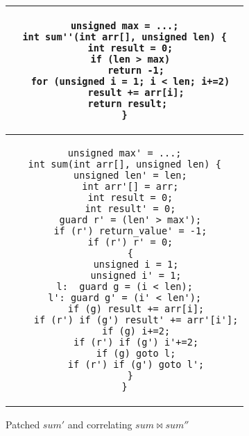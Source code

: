 \begin{figure}
\centering
\begin{tabular}{c}
\begin{lstlisting}
unsigned max = ...;
int sum''(int arr[], unsigned len) {
  int result = 0;
  if (len > max)
    return -1;
  for (unsigned i = 1; i < len; i+=2)
    result += arr[i];
 return result;
}
\end{lstlisting}
\\ \hline
\begin{lstlisting}
unsigned max' = ...;
int sum(int arr[], unsigned len) {
  unsigned len' = len;
  int arr'[] = arr;
  int result = 0;
  int result' = 0;
  guard r' = (len' > max');
  if (r') return_value' = -1;
  if (r') r' = 0;
  {
    unsigned i = 1;
    unsigned i' = 1;
l:  guard g = (i < len);
l': guard g' = (i' < len');
    if (g) result += arr[i];
    if (r') if (g') result' += arr'[i'];
    if (g) i+=2;
    if (r') if (g') i'+=2;
    if (g) goto l;
    if (r') if (g') goto l';
  }
}
\end{lstlisting}
\end{tabular}
\caption{Patched $sum'$ and correlating $sum \bowtie sum''$}
\end{figure} 